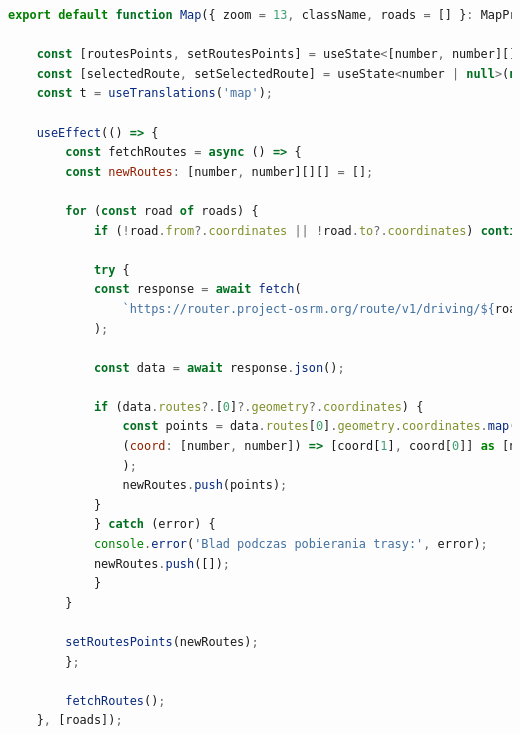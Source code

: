 {\belowcaptionskip=-9pt
\begin{lstlisting}[language=JavaScript,caption=Pobieranie najkrótszych tras między punktami, label=lst:fetchRoutes]
export default function Map({ zoom = 13, className, roads = [] }: MapProps) {
    
    const [routesPoints, setRoutesPoints] = useState<[number, number][][]>([]);
    const [selectedRoute, setSelectedRoute] = useState<number | null>(null);
    const t = useTranslations('map');

    useEffect(() => {
        const fetchRoutes = async () => {
        const newRoutes: [number, number][][] = [];
    
        for (const road of roads) {
            if (!road.from?.coordinates || !road.to?.coordinates) continue;
    
            try {
            const response = await fetch(
                `https://router.project-osrm.org/route/v1/driving/${road.from.coordinates[1]},${road.from.coordinates[0]};${road.to.coordinates[1]},${road.to.coordinates[0]}?overview=full&geometries=geojson`,
            );
    
            const data = await response.json();
    
            if (data.routes?.[0]?.geometry?.coordinates) {
                const points = data.routes[0].geometry.coordinates.map(
                (coord: [number, number]) => [coord[1], coord[0]] as [number, number],
                );
                newRoutes.push(points);
            }
            } catch (error) {
            console.error('Blad podczas pobierania trasy:', error);
            newRoutes.push([]);
            }
        }
    
        setRoutesPoints(newRoutes);
        };
    
        fetchRoutes();
    }, [roads]);
  \end{lstlisting}
  }
  
